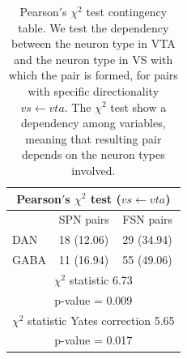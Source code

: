 \begin{table}[H]
\begin{tabular}{ |p{3cm}|p{3cm}|p{3cm}| }
 \hline
 \multicolumn{3}{|c|}{Pearson$'$s $\chi^2$ test ($vs \leftarrow vta$)} \\
 \hline
 & SPN pairs & FSN pairs\\
 \hline
 DAN & 18 (12.06) & 29 (34.94) \\
 \hline
 GABA & 11 (16.94) & 55 (49.06)\\
 \hline
 \multicolumn{3}{|c|}{$\chi^2$ statistic  6.73}\\
 \multicolumn{3}{|c|}{p-value = 0.009}\\
 \hline
 \multicolumn{3}{|c|}{$\chi^2$ statistic Yates correction 5.65}\\
 \multicolumn{3}{|c|}{p-value = 0.017}\\
 \hline
\end{tabular}
\caption{Pearson$'$s $\chi^{2}$ test contingency table. We test the dependency between the neuron type in VTA and the neuron type in VS with which the pair is formed, for pairs with specific directionality $vs \leftarrow vta$. The $\chi^2$ test show a dependency among variables, meaning that resulting pair depends on the neuron types involved.}
\label{tab:chisquare_vtavs}
\end{table}

